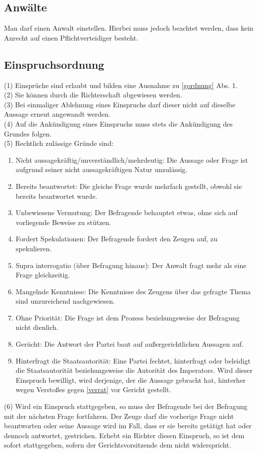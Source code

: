 \documentclass{article}
\begin{document}
\subsection{Anwälte}
Man darf einen Anwalt einstellen. Hierbei muss jedoch beachtet werden, dass kein Anrecht auf einen Pflichtverteidiger besteht.

\subsection{Einspruchsordnung}\label{eordnung}
(1) Einsprüche sind erlaubt und bilden eine Ausnahme zu \ref{gordnung} Abs. 1.\\
(2) Sie können durch die Richterschaft abgewiesen werden.\\
(3) Bei einmaliger Ablehnung eines Einspruchs darf dieser nicht auf dieselbe Aussage erneut angewandt werden.\\
(4) Auf die Ankündigung eines Einspruchs muss stets die Ankündigung des Grundes folgen.\\
(5) Rechtlich zulässige Gründe sind:
\begin{enumerate}
\item Nicht aussagekräftig/unverständlich/mehrdeutig: Die Aussage oder Frage ist aufgrund seiner nicht aussagekräftigen Natur unzulässig.
\item Bereits beantwortet: Die gleiche Frage wurde mehrfach gestellt, obwohl sie bereits beantwortet wurde.
\item Unbewiesene Vermutung: Der Befragende behauptet etwas, ohne sich auf vorliegende Beweise zu stützen.
\item Fordert Spekulationen: Der Befragende fordert den Zeugen auf, zu spekulieren.
\item Supra interrogatio (über Befragung hinaus): Der Anwalt fragt mehr als eine Frage gleichzeitig.
\item Mangelnde Kenntnisse: Die Kenntnisse des Zeugens über das gefragte Thema sind unzureichend nachgewiesen.
\item Ohne Priorität: Die Frage ist dem Prozess beziehungsweise der Befragung nicht dienlich.
\item Gerücht: Die Antwort der Partei baut auf außergerichtlichen Aussagen auf.
\item Hinterfragt die Staatsautorität: Eine Partei fechtet, hinterfragt oder beleidigt die Staatsautorität beziehungsweise die Autorität des Imperators. Wird dieser Einspruch bewilligt, wird derjenige, der die Aussage gebracht hat, hinterher wegen Verstoßes gegen \ref{verrat} vor Gericht gestellt.
\end{enumerate}
(6) Wird ein Einspruch stattgegeben, so muss der Befragende bei der Befragung mit der nächsten Frage fortfahren. Der Zeuge darf die vorherige Frage nicht beantworten oder seine Aussage wird im Fall, dass er sie bereits getätigt hat oder dennoch antwortet, gestrichen. Erhebt ein Richter diesen Einspruch, so ist dem sofort stattgegeben, sofern der Gerichtsvorsitzende dem nicht widerspricht.
\end{document}
